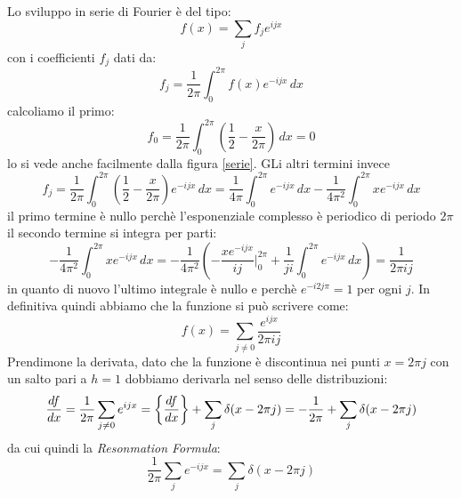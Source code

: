 Lo sviluppo in serie di Fourier è del tipo:
\[f(x) = \sum_j f_j e^{ijx}\]
con i coefficienti $f_j$ dati da:
\[f_j = \frac{1}{2\pi}\int_0^{2\pi} f(x)e^{-ijx}\, dx\]
calcoliamo il primo:
\[f_0 = \frac{1}{2\pi}\int_0^{2\pi}\left(\frac{1}{2}-\frac{x}{2\pi}\right)\, dx = 0\]
lo si vede anche facilmente dalla figura \eqref{serie}. GLi altri termini invece
\[f_j = \frac{1}{2\pi}\int_0^{2\pi} \left(\frac{1}{2}-\frac{x}{2\pi}\right)e^{-ijx}\, dx  =  \frac{1}{4\pi}\int_0^{2\pi}e^{-ijx}\, dx - \frac{1}{4\pi^2}\int_0^{2\pi} xe^{-ijx}\, dx\]
il primo termine è nullo perchè l'esponenziale complesso è periodico di periodo $2\pi$ il secondo termine si integra per parti:
\[- \frac{1}{4\pi^2}\int_0^{2\pi} xe^{-ijx}\, dx = - \frac{1}{4\pi^2}\left(-\frac{xe^{-ijx}}{ij}\bigg|_0^{2\pi}+\frac{1}{ji}\int_0^{2\pi}e^{-ijx}\, dx\right) =\frac{1}{2\pi i j}\]
in quanto di nuovo l'ultimo integrale è nullo e perchè $e^{-i2j\pi} = 1$ per ogni $j$. In definitiva quindi abbiamo che la funzione si può scrivere come:
\[f(x) = \sum_{j\neq 0} \frac{e^{ijx}}{2\pi i j}\]
Prendimone la derivata, dato che la funzione è discontinua nei punti $x=2\pi j$ con un salto pari a $h=1$ dobbiamo derivarla nel senso delle distribuzioni:
\[\frac{d f}{d x} = \frac{1}{2\pi}\sum_{j\neq 0} e^{ijx} = \bigg\{\frac{d f}{d x}\bigg\} + \sum_j \delta(x-2\pi j) = -\frac{1}{2\pi}  + \sum_j \delta(x-2\pi j)\]
da cui quindi la \emph{Resonmation Formula}:
\[\frac{1}{2\pi}\sum_{j} e^{-ijx} = \sum_j \delta(x-2\pi j)\]
